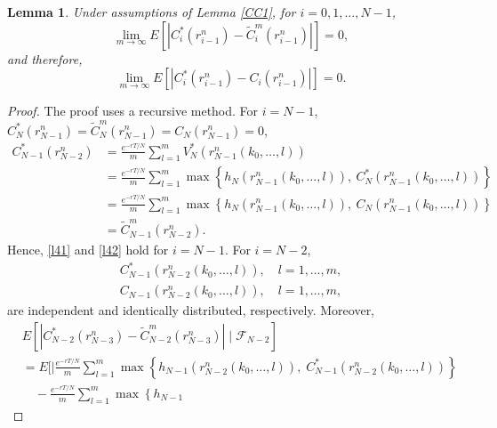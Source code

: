 \documentclass[10pt,a4paper]{amsart}
\numberwithin{equation}{section}
\newtheorem{lemma}[theo]{Lemma}
\begin{document}
\begin{lemma}
\label{CC2}
Under assumptions of Lemma \ref{CC1}, for $i=0,1, \dots, N-1$,
 \begin{equation}
 \label{l41}
 \lim _{m \to \infty} E\left[\left|C_i^*\left(r_{i-1}^{n}\right)-\widetilde{C}_i^m\left(r_{i-1}^n\right)\right|\right]=0,
 \end{equation}
and therefore,
\begin{equation}
\label{l42}
 \lim _{m \to \infty} E\left[\left|C_i^*\left(r_{i-1}^{n}\right)-C_i\left(r_{i-1}^{n}\right)\right|\right]=0.
\end{equation}
\end{lemma}

\begin{proof}
The proof uses a recursive method. For $i=N-1$, 
$C_N^*\left(r_{N-1}^{n}\right)=\widetilde{C}_N^m\left(r_{N-1}^n\right)
=C_N\left(r_{N-1}^{n}\right)=0$,
\begin{align*}
 C_{N-1}^*\left(r_{N-2}^{n}\right)
 &= \frac{e^{-rT/N}}{m} \sum_{l=1}^{m} V_{N}^*\left(r_{N-1}^{n}\left(k_0,\dots,l\right)\right) \\
 &= \frac{e^{-rT/N}}{m} \sum_{l=1}^{m} \max \left\{h_N\left(r_{N-1}^{n}\left(k_0,\dots,l\right)\right), \ C_N^*\left(r_{N-1}^{n}\left(k_0,\dots,l\right)\right) \right\} \\
 &= \frac{e^{-rT/N}}{m} \sum_{l=1}^{m} \max \left\{h_N\left(r_{N-1}^{n}\left(k_0,\dots,l\right)\right), \ C_N\left(r_{N-1}^{n}\left(k_0,\dots,l\right)\right) \right\} \\
 &= \widetilde{C}_{N-1}^m\left(r_{N-2}^n\right).
\end{align*}
Hence, \eqref{l41} and \eqref{l42} hold for $i=N-1$. For $i=N-2$,
\begin{gather*}
 C_{N-1}^*\left(r_{N-2}^{n}\left(k_0,\dots,l\right)\right), \quad l=1,\dots,m,\\
 C_{N-1}\left(r_{N-2}^{n}\left(k_0,\dots,l\right)\right), \quad l=1,\dots,m,
\end{gather*}
are independent and identically distributed, respectively. Moreover,
\begin{align*}
& E\left[\left|C_{N-2}^*\left(r_{N-3}^{n}\right)-\widetilde{C}_{N-2}^m\left(r_{N-3}^n\right)\right| \mid \mathcal{F}_{N-2}\right] \\
&=  E\Big[\Big| \frac{e^{-rT/N}}{m} \sum_{l=1}^{m} \max \left\{h_{N-1}
 \left(r_{N-2}^{n}\left(k_0,\dots,l\right)\right), \;
  C_{N-1}^*\left(r_{N-2}^{n}\left(k_0,\dots,l\right)\right)\right\} \\
&\quad -\frac{e^{-rT/N}}{m} \sum_{l=1}^{m} \max \left\{h_{N-1}

\end{align*}
\end{proof}
\end{document}
